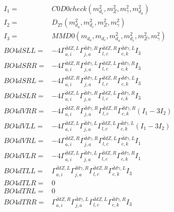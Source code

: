 \documentclass[A4,landscape]{article}
\begin{document}
\begin{align} 
I_1 = & C0D0check(m^2_{d_{{c}}}, m^2_{Z}, m^2_{\gamma}, m^2_{d_{{a}}}) \\ 
I_2 = & D_{27}(m^2_{d_{{a}}}, m^2_{d_{{c}}}, m^2_{Z}, m^2_{\gamma}) \\ 
I_3 = & MMD0(m_{d_{{a}}}, m_{d_{{c}}}, m^2_{d_{{a}}}, m^2_{d_{{c}}}, m^2_{Z}, m^2_{\gamma}) \\ 
  BO4dSLL= & -4  \Gamma^{\bar{d}d Z ,L}_{a, i} \Gamma^{\bar{d}d \gamma ,R}_{j, a} \Gamma^{\bar{d}d Z ,R}_{l, c} \Gamma^{\bar{d}d \gamma ,L}_{c, k} I_3 \\ 
  BO4dSRR= & -4  \Gamma^{\bar{d}d Z ,R}_{a, i} \Gamma^{\bar{d}d \gamma ,L}_{j, a} \Gamma^{\bar{d}d Z ,L}_{l, c} \Gamma^{\bar{d}d \gamma ,R}_{c, k} I_3 \\ 
  BO4dSRL= & -4  \Gamma^{\bar{d}d Z ,R}_{a, i} \Gamma^{\bar{d}d \gamma ,L}_{j, a} \Gamma^{\bar{d}d Z ,R}_{l, c} \Gamma^{\bar{d}d \gamma ,L}_{c, k} I_3 \\ 
  BO4dSLR= & -4  \Gamma^{\bar{d}d Z ,L}_{a, i} \Gamma^{\bar{d}d \gamma ,R}_{j, a} \Gamma^{\bar{d}d Z ,L}_{l, c} \Gamma^{\bar{d}d \gamma ,R}_{c, k} I_3 \\ 
  BO4dVRR= & -4  \Gamma^{\bar{d}d Z ,R}_{a, i} \Gamma^{\bar{d}d \gamma ,R}_{j, a} \Gamma^{\bar{d}d Z ,R}_{l, c} \Gamma^{\bar{d}d \gamma ,R}_{c, k} (I_1 - 3 I_2) \\ 
  BO4dVLL= & -4  \Gamma^{\bar{d}d Z ,L}_{a, i} \Gamma^{\bar{d}d \gamma ,L}_{j, a} \Gamma^{\bar{d}d Z ,L}_{l, c} \Gamma^{\bar{d}d \gamma ,L}_{c, k} (I_1 - 3 I_2) \\ 
  BO4dVRL= & -4  \Gamma^{\bar{d}d Z ,R}_{a, i} \Gamma^{\bar{d}d \gamma ,R}_{j, a} \Gamma^{\bar{d}d Z ,L}_{l, c} \Gamma^{\bar{d}d \gamma ,L}_{c, k} I_1 \\ 
  BO4dVLR= & -4  \Gamma^{\bar{d}d Z ,L}_{a, i} \Gamma^{\bar{d}d \gamma ,L}_{j, a} \Gamma^{\bar{d}d Z ,R}_{l, c} \Gamma^{\bar{d}d \gamma ,R}_{c, k} I_1 \\ 
  BO4dTLL= &  \Gamma^{\bar{d}d Z ,L}_{a, i} \Gamma^{\bar{d}d \gamma ,R}_{j, a} \Gamma^{\bar{d}d Z ,R}_{l, c} \Gamma^{\bar{d}d \gamma ,L}_{c, k} I_3 \\ 
  BO4dTLR= & 0 \\ 
  BO4dTRL= & 0 \\ 
  BO4dTRR= &  \Gamma^{\bar{d}d Z ,R}_{a, i} \Gamma^{\bar{d}d \gamma ,L}_{j, a} \Gamma^{\bar{d}d Z ,L}_{l, c} \Gamma^{\bar{d}d \gamma ,R}_{c, k} I_3 \\ 
\end{align} 
\end{document}

